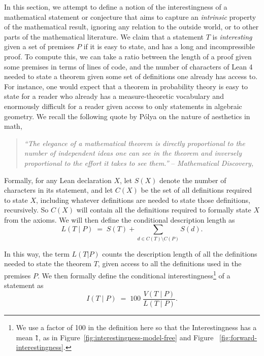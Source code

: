 In this section, we attempt to define a notion of the interestingness of a mathematical statement or conjecture that aims to capture an \emph{intrinsic} property of the mathematical result, ignoring any relation to the outside world, or to other parts of the mathematical literature.
%
We claim that a statement $T$ is \emph{interesting} given a set of premises $P$ if it is easy to state, and has a long and incompressible proof.
%
To compute this, we can take a ratio between the length of a proof given some premises in terms of lines of code, and the number of characters of Lean 4 needed to state a theorem given some set of definitions one already has access to.
%
For instance, one would expect that a theorem in probability theory is easy to state for a reader who already has a measure-theoretic vocabulary and enormously difficult for a reader given access to only statements in algebraic geometry.
%
We recall the following quote by Pólya on the nature of aesthetics in math,

{
\begin{quote}
    { \emph{``The elegance of a mathematical theorem is directly proportional to the number of independent ideas one can see in the theorem and inversely proportional to the effort it takes to see them.''}} -- \emph{Mathematical Discovery, } \cite{polya1981mathematical}
\end{quote}
}

Formally, for any Lean declaration $X$, let $S(X)$ denote the number of characters in its statement, and let $C(X)$ be the set of all definitions required to state $X$, including whatever definitions are needed to state those definitions, recursively.
%
So $C(X)$ will contain all the definitions required to formally state $X$ from the axioms.
%
We will then define the conditional description length as
\begin{equation}
  L(T\mid P)\;=\;S(T)+\!\!\sum_{d\in C(T)\setminus C(P)}\!\!S(d).
  \label{eq:conditional-length}
\end{equation}

In this way, the term $L(T|P)$ counts the description length of all the definitions needed to state the theorem $T$, given  access to all the definitions used in the premises $P$.
%
We then formally define the conditional interestingness\footnote{We use a factor of 100 in the definition here so that the Interestingness has a mean \~1, as in Figure~\ref{fig:interestingness-model-free} and Figure ~\ref{fig:forward-interestingness}.} of a statement as 
\begin{equation}
  I(T\mid P)\;=\;100\;\frac{V(T\mid P)}{L(T\mid P)}.
  \label{eq:interestingness}
\end{equation}

